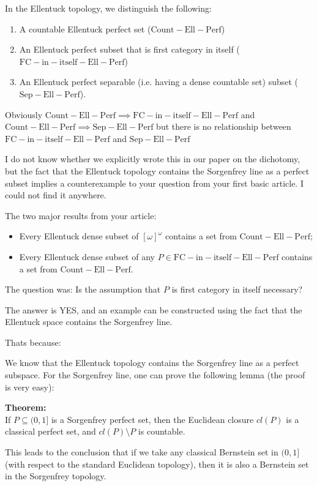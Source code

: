 \documentclass[12pt]{amsart}
\newcommand{\countableEllentuckPerfect}{\mathrm{Count-Ell-Perf}}
\newcommand{\fcInItselfEllentuckPerfect}{\mathrm{FC-in-itself-Ell-Perf}}
\newcommand{\separableEllentuckPerfect}{\mathrm{Sep-Ell-Perf}}
\begin{document}
In the Ellentuck topology, we distinguish the following:
\begin{enumerate}
\item
A countable Ellentuck perfect set ($\countableEllentuckPerfect$)
\item
An Ellentuck perfect subset that is first category in itself
($\fcInItselfEllentuckPerfect$)
\item
An Ellentuck perfect separable (i.e. having a dense countable set) subset ($\separableEllentuckPerfect$).
\end{enumerate}

Obviously 
  $\countableEllentuckPerfect \implies \fcInItselfEllentuckPerfect$
and
  $\countableEllentuckPerfect \implies \separableEllentuckPerfect$
but there is no relationship between
$\fcInItselfEllentuckPerfect$ and $\separableEllentuckPerfect$

I do not know whether we explicitly wrote this in our paper on the dichotomy,
but the fact that the Ellentuck topology contains the Sorgenfrey line
as a perfect subset implies a counterexample to your
question from your first basic article.
I could not find it anywhere.

The two major results from your article:
\begin{itemize}
\item
  Every Ellentuck dense subset of $[\omega]^\omega$ contains
a set from $\countableEllentuckPerfect$;
\item
  Every Ellentuck dense subset of any $P \in \fcInItselfEllentuckPerfect$
contains a set from $\countableEllentuckPerfect$.
\end{itemize}

The question was:
Is the assumption that $P$ is first category in itself necessary?

The answer is YES, and an example can be constructed using the fact that the
Ellentuck space contains the Sorgenfrey line.

Thats because:

We know that the Ellentuck topology contains the Sorgenfrey
line as a perfect subspace. For the Sorgenfrey line, one can prove the following lemma (the proof is very easy):

{\bf Theorem: }\\
If $P \subseteq (0,1]$ is a Sorgenfrey perfect set, then
the Euclidean closure $\mathit{cl}(P)$ is a classical perfect
set, and $\mathit{cl}(P) \setminus P$ is countable.

This leads to the conclusion that if we take any classical
Bernstein set in $(0,1]$ (with respect to the standard Euclidean topology),
then it is also a Bernstein set in the Sorgenfrey topology.
\end{document}
